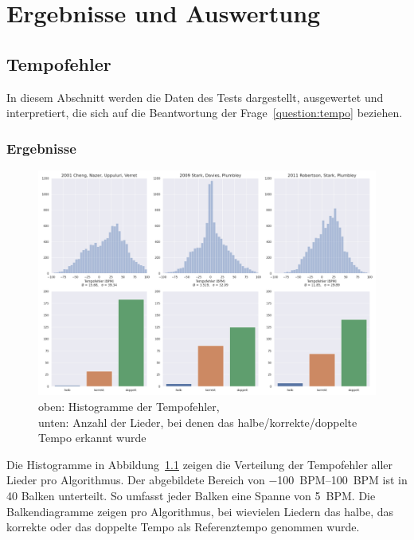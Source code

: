 \chapter{Ergebnisse und Auswertung}
\label{ergebnisse}


\section{Tempofehler}
{
	In diesem Abschnitt werden die Daten des Tests dargestellt, ausgewertet und interpretiert,
		die sich auf die Beantwortung der Frage~\ref{question:tempo} beziehen.

	\subsection{Ergebnisse}
	{
		\begin{figure}[h]
			\hspace{-17mm}
			\includegraphics[scale=0.4]{resources/tempo_error_histogram.png}
			\caption{
				oben: Histogramme der Tempofehler, \\
				unten: Anzahl der Lieder, bei denen das halbe/korrekte/doppelte Tempo erkannt wurde
			}
			\label{fig:tempoerror}
		\end{figure}

		Die Histogramme in Abbildung~\ref{fig:tempoerror} zeigen die Verteilung der Tempofehler aller Lieder pro Algorithmus.
		Der abgebildete Bereich von \SIrange{-100}{100}{BPM} ist in \num{40} Balken unterteilt.
		So umfasst jeder Balken eine Spanne von \SI{5}{BPM}.
		Die Balkendiagramme zeigen pro Algorithmus,
			bei wievielen Liedern das halbe, das korrekte oder das doppelte Tempo als Referenztempo genommen wurde.

}}
